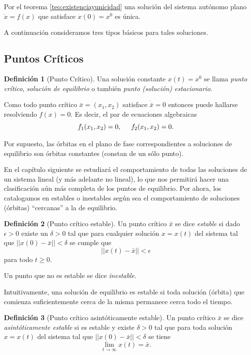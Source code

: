 \documentclass[11pt]{book}
\theoremstyle{definition}
\newtheorem{definition}{Definición}
\numberwithin{definition}{section}
\theoremstyle{theorem}
\numberwithin{theorem}{section}
\numberwithin{lemma}{section}
\numberwithin{corollary}{section}
\theoremstyle{plain}
\numberwithin{example}{section}
\begin{document}
Por el teorema \ref{teo:existenciayunicidad} una solución del sistema autónomo plano $\dot{x} = f(x)$ que satisface $x(0) = x^0$ es única. 

A continuación consideramos tres tipos básicos para tales soluciones.

\subsection{Puntos Críticos}

\begin{definition}[Punto Crítico] Una solución constante $x(t) = x^0$ se llama \emph{punto crítico}, \emph{solución de equilibrio} o también \emph{punto (solución) estacionario}.
\end{definition}

Como todo punto crítico $\bar{x} = (x_1,x_2)$ satisface $\dot{\bar{x}} = 0$ entonces puede hallarse resolviendo $f(x) = 0$. Es decir, el par de ecuaciones algebraicas
$$ f_1(x_1, x_2) = 0, \hspace{0.2in} f_2(x_1, x_2) = 0.$$

Por supuesto, las órbitas en el plano de fase correspondientes a soluciones de equilibrio son órbitas constantes (constan de un sólo punto).

En el capítulo siguiente se estudiará el comportamiento de todas las soluciones de un sistema lineal (y más adelante no lineal), lo que nos permitirá hacer una clasificación aún más completa de los puntos de equilibrio. Por ahora, los catalogamos en estables o inestables según sea el comportamiento de soluciones (órbitas) ``cercanas'' a la de equilibrio.

\begin{definition}[Punto crítico estable]Un punto crítico $\bar{x}$ se dice \emph{estable} si dado $\epsilon > 0$ existe un $\delta > 0$ tal que para cualquier solución $x = x(t)$ del sistema tal que $|| x(0) - \bar{x} || < \delta$ se cumple que
$$ || x(t) - \bar{x} || < \epsilon$$
para todo $t \geq 0$.

Un punto que no es estable se dice \emph{inestable}.
\end{definition}

Intuitivamente, una solución de equilibrio es estable si toda solución (órbita) que comienza suficientemente cerca de la misma permanece cerca todo el tiempo.

\begin{definition}[Punto crítico asintóticamente estable]Un punto crítico $\bar{x}$ se dice \emph{asintóticamente estable} si es estable y existe $\delta > 0$ tal que para toda solución $x = x(t)$ del sistema tal que $|| x(0) - \bar{x} || < \delta$ se tiene $$\lim_{t \to \infty} x(t) = \bar{x}. $$
\end{definition}
\end{document}
